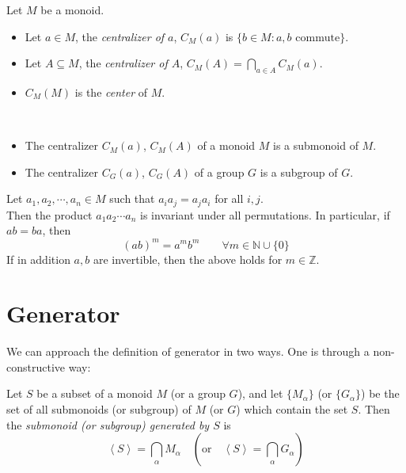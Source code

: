 \begin{definition} Let $M$ be a monoid.
\begin{itemize}
    \item Let $a \in M$, the \textit{centralizer of $a$}, $C_M(a)$ is $\{ b \in M : a,b \text{ commute} \}$.
    \item Let $A \subseteq M$, the \textit{centralizer of $A$}, $C_M(A)= \bigcap_{a \in A} C_M(a)$.
    \item $C_M(M)$ is the \textit{center} of $M$.
\end{itemize}
\end{definition}

\begin{remark} ~
\begin{itemize}
    \item The centralizer $C_M(a)$, $C_M(A)$ of a monoid $M$ is a submonoid of $M$.
    \item The centralizer $C_G(a)$, $C_G(A)$ of a group $G$ is a subgroup of $G$.
\end{itemize}
\end{remark}

\begin{prop}
Let $a_1,a_2,\cdots ,a_n \in M$ such that $a_ia_j=a_ja_i$ for all $i,j$.
\\Then the product $a_1a_2\cdots a_n$ is invariant under all permutations. In particular, if $ab = ba$, then
$$
(ab)^{m} = a^{m}b^{m} \qquad \forall m \in \mathbb{N} \cup \{ 0 \}
$$
If in addition $a,b$ are invertible, then the above holds for $m \in \mathbb{Z}$.
\end{prop}


\newpage

\section{Generator} \label{sec:}

We can approach the definition of generator in two ways. One is through a non-constructive way:
\begin{definition}[Generator]
Let $S$ be a subset of a monoid $M$ (or a group $G$), and let $\{ M_\alpha \}$ (or $\{ G_\alpha \}$) be the set of all submonoids (or subgroup) of $M$ (or $G$) which contain the set $S$.
Then the \textit{submonoid (or subgroup) generated by $S$} is
$$
\left<S \right> = \bigcap_{\alpha}M_\alpha \quad \left(\text{or} \quad \left<S \right> = \bigcap_{\alpha}G_\alpha\right)
$$ 
\end{definition}


